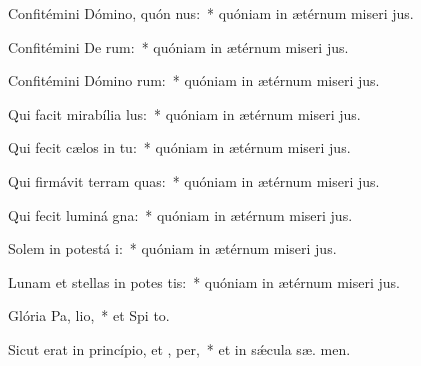 \item Confitémini Dómino, quón nus:~* quóniam in ætérnum miseri jus.
\item Confitémini De rum:~* quóniam in ætérnum miseri jus.
\item Confitémini Dómino rum:~* quóniam in ætérnum miseri jus.
\item Qui facit mirabília  lus:~* quóniam in ætérnum miseri jus.
\item Qui fecit cælos in tu:~* quóniam in ætérnum miseri jus.
\item Qui firmávit terram  quas:~* quóniam in ætérnum miseri jus.
\item Qui fecit luminá gna:~* quóniam in ætérnum miseri jus.
\item Solem in potestá i:~* quóniam in ætérnum miseri jus.
\item Lunam et stellas in potes tis:~* quóniam in ætérnum miseri jus.
\item Glória Pa,  lio,~* et Spi to.
\item Sicut erat in princípio, et ,  per,~* et in sǽcula sæ. men.
